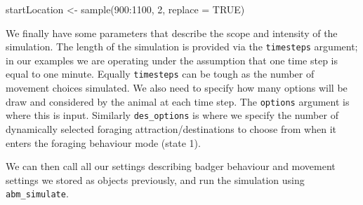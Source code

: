 \documentclass[10pt,a4paper]{article}
\newenvironment{Shaded}{}{}
\newcommand{\AttributeTok}[1]{#1}
\newcommand{\ConstantTok}[1]{#1}
\newcommand{\DecValTok}[1]{#1}
\newcommand{\FunctionTok}[1]{#1}
\newcommand{\NormalTok}[1]{#1}
\newcommand{\OtherTok}[1]{#1}
\newcommand{\SpecialCharTok}[1]{#1}
\begin{document}
\begin{Shaded}
\begin{Highlighting}[]
\NormalTok{startLocation }\OtherTok{\textless{}{-}} \FunctionTok{sample}\NormalTok{(}\DecValTok{900}\SpecialCharTok{:}\DecValTok{1100}\NormalTok{, }\DecValTok{2}\NormalTok{, }\AttributeTok{replace =} \ConstantTok{TRUE}\NormalTok{)}
\end{Highlighting}
\end{Shaded}

We finally have some parameters that describe the scope and intensity of the simulation.
The length of the simulation is provided via the \texttt{timesteps} argument; in our examples we are operating under the assumption that one time step is equal to one minute.
Equally \texttt{timesteps} can be tough as the number of movement choices simulated.
We also need to specify how many options will be draw and considered by the animal at each time step.
The \texttt{options} argument is where this is input.
Similarly \texttt{des\_options} is where we specify the number of dynamically selected foraging attraction/destinations to choose from when it enters the foraging behaviour mode (state 1).

We can then call all our settings describing badger behaviour and movement settings we stored as objects previously, and run the simulation using \texttt{abm\_simulate}.
\end{document}
